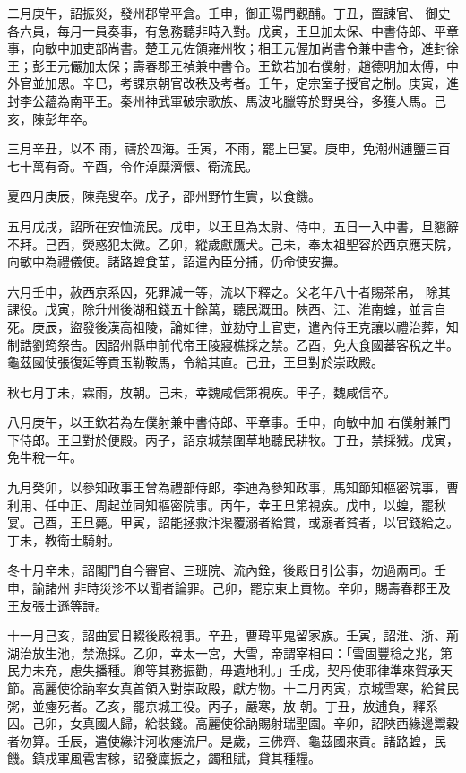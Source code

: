 \begin{pinyinscope}
 二月庚午，詔振災，發州郡常平倉。壬申，御正陽門觀酺。丁丑，置諫官、
 御史各六員，每月一員奏事，有急務聽非時入對。戊寅，王旦加太保、中書侍郎、平章事，向敏中加吏部尚書。楚王元佐領雍州牧；相王元偓加尚書令兼中書令，進封徐王；彭王元儼加太保；壽春郡王禎兼中書令。王欽若加右僕射，趙德明加太傅，中外官並加恩。辛巳，考課京朝官改秩及考者。壬午，定宗室子授官之制。庚寅，進封李公蘊為南平王。秦州神武軍破宗歌族、馬波叱臘等於野吳谷，多獲人馬。己亥，陳彭年卒。



 三月辛丑，以不
 雨，禱於四海。壬寅，不雨，罷上巳宴。庚申，免潮州逋鹽三百七十萬有奇。辛酉，令作淖糜濟懷、衛流民。



 夏四月庚辰，陳堯叟卒。戊子，邵州野竹生實，以食饑。



 五月戊戌，詔所在安恤流民。戊申，以王旦為太尉、侍中，五日一入中書，旦懇辭不拜。己酉，熒惑犯太微。乙卯，縱歲獻鷹犬。己未，奉太祖聖容於西京應天院，向敏中為禮儀使。諸路蝗食苗，詔遣內臣分捕，仍命使安撫。



 六月壬申，赦西京系囚，死罪減一等，流以下釋之。父老年八十者賜茶帛，
 除其課役。戊寅，除升州後湖租錢五十餘萬，聽民溉田。陜西、江、淮南蝗，並言自死。庚辰，盜發後漢高祖陵，論如律，並劾守土官吏，遣內侍王克讓以禮治葬，知制誥劉筠祭告。因詔州縣申前代帝王陵寢樵採之禁。乙酉，免大食國蕃客稅之半。龜茲國使張復延等貢玉勒鞍馬，令給其直。己丑，王旦對於崇政殿。



 秋七月丁未，霖雨，放朝。己未，幸魏咸信第視疾。甲子，魏咸信卒。



 八月庚午，以王欽若為左僕射兼中書侍郎、平章事。壬申，向敏中加
 右僕射兼門下侍郎。王旦對於便殿。丙子，詔京城禁圍草地聽民耕牧。丁丑，禁採狨。戊寅，免牛稅一年。



 九月癸卯，以參知政事王曾為禮部侍郎，李迪為參知政事，馬知節知樞密院事，曹利用、任中正、周起並同知樞密院事。丙午，幸王旦第視疾。戊申，以蝗，罷秋宴。己酉，王旦薨。甲寅，詔能拯救汴渠覆溺者給賞，或溺者貧者，以官錢給之。丁未，教衛士騎射。



 冬十月辛未，詔閣門自今審官、三班院、流內銓，後殿日引公事，勿過兩司。壬申，諭諸州
 非時災沴不以聞者論罪。己卯，罷京東上貢物。辛卯，賜壽春郡王及王友張士遜等詩。



 十一月己亥，詔曲宴日輟後殿視事。辛丑，曹瑋平鬼留家族。壬寅，詔淮、浙、荊湖治放生池，禁漁採。乙卯，幸太一宮，大雪，帝謂宰相曰：「雪固豐稔之兆，第民力未充，慮失播種。卿等其務振勸，毋遺地利。」壬戌，契丹使耶律準來賀承天節。高麗使徐訥率女真首領入對崇政殿，獻方物。十二月丙寅，京城雪寒，給貧民粥，並瘞死者。乙亥，罷京城工役。丙子，嚴寒，放
 朝。丁丑，放逋負，釋系囚。己卯，女真國人歸，給裝錢。高麗使徐訥賜射瑞聖園。辛卯，詔陜西緣邊鬻穀者勿算。壬辰，遣使緣汴河收瘞流尸。是歲，三佛齊、龜茲國來貢。諸路蝗，民饑。鎮戎軍風雹害稼，詔發廩振之，蠲租賦，貸其種糧。




\end{pinyinscope}
